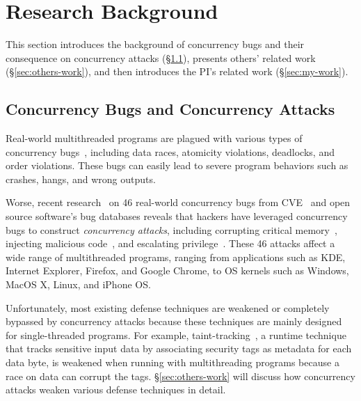 
\vspace{-.15in}\section{Research Background} \label{sec:related}\vspace{-.075in}

This section introduces the background of concurrency bugs and 
their consequence on concurrency attacks (\S\ref{sec:background}), 
presents others' related work (\S\ref{sec:others-work}), and then introduces 
the PI's related work (\S\ref{sec:my-work}).

\vspace{-.15in}\subsection{Concurrency Bugs and Concurrency Attacks} 
\label{sec:background}\vspace{-.075in}

Real-world multithreaded programs are plagued with various types of concurrency 
bugs~\cite{lu:concurrency-bugs}, including data races, atomicity violations, 
deadlocks, and order violations. These bugs can easily lead to severe program 
behaviors such as crashes, hangs, and wrong outputs.



Worse, recent research~\cite{con:hotpar12} on 46 real-world concurrency bugs 
from CVE~\cite{cve-races} and open source software's bug databases reveals 
that hackers have leveraged concurrency bugs to construct \emph{concurrency 
attacks}, including corrupting critical memory~\cite{apache-bug-25520}, 
injecting malicious code~\cite{libsafe:bug}, and escalating 
privilege~\cite{uselib-bug-12791}. These 46 attacks affect a wide range of 
multithreaded programs, ranging from applications such as KDE, Internet 
Explorer, Firefox, and Google Chrome, to OS kernels such as Windows, MacOS X, 
Linux, and iPhone OS.

Unfortunately, most existing defense techniques are weakened or completely 
bypassed by concurrency attacks because these techniques are mainly designed 
for single-threaded programs. For example, 
taint-tracking~\cite{taintdroid:osdi10, lift:micro06, myers:information, 
valgrind:pldi}, a runtime technique that tracks sensitive input data by 
associating security tags as metadata for each data byte, is weakened when running with 
multithreading programs because a race on data can corrupt the tags. \S\ref{sec:others-work} 
will discuss how concurrency attacks weaken various defense techniques in 
detail.


